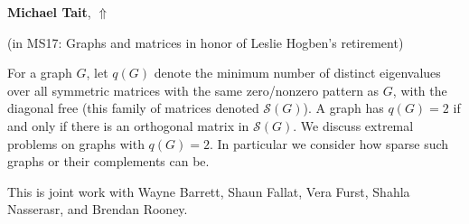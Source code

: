 \documentclass[ILAS2025-program.tex]{subfiles}
\begin{document}
     \hypertarget{down0178}{}\begin{ilasabstract}
    
    \textbf{Michael Tait},  \hfill \hyperlink{up0178}{$\Uparrow$}
    
    (in {\color{mstitle}MS17: Graphs and matrices in honor of Leslie Hogben's retirement})
        
        \mtskip
    For a graph $G$, let $q(G)$ denote the minimum number of distinct eigenvalues over all symmetric matrices with the same zero/nonzero pattern as $G$, with the diagonal free (this family of matrices denoted $\mathcal{S}(G)$). A graph has $q(G) = 2$ if and only if there is an orthogonal matrix in $\mathcal{S}(G)$. We discuss extremal problems on graphs with $q(G)=2$. In particular we consider how sparse such graphs or their complements can be.

This is joint work with Wayne Barrett, Shaun Fallat, Vera Furst, Shahla Nasserasr, and Brendan Rooney.

\end{ilasabstract}
\end{document}
